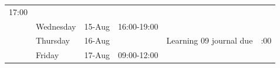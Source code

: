 \documentclass[]{book}
\theoremstyle{definition}
\theoremstyle{definition}
\theoremstyle{definition}
\theoremstyle{remark}
\begin{document}
\begin{longtable}[]{@{}rllllr@{}}
\begin{minipage}[t]{0.08\columnwidth}
17:00\strut
\end{minipage}\tabularnewline
\begin{minipage}[t]{0.08\columnwidth}\raggedleft
\strut
\end{minipage} & \begin{minipage}[t]{0.12\columnwidth}\raggedright
Wednesday\strut
\end{minipage} & \begin{minipage}[t]{0.09\columnwidth}\raggedright
15-Aug\strut
\end{minipage} & \begin{minipage}[t]{0.16\columnwidth}\raggedright
16:00-19:00\strut
\end{minipage} & \begin{minipage}[t]{0.29\columnwidth}\raggedright
\strut
\end{minipage} & \begin{minipage}[t]{0.08\columnwidth}\raggedleft
\strut
\end{minipage}\tabularnewline
\begin{minipage}[t]{0.08\columnwidth}\raggedleft
\strut
\end{minipage} & \begin{minipage}[t]{0.12\columnwidth}\raggedright
Thursday\strut
\end{minipage} & \begin{minipage}[t]{0.09\columnwidth}\raggedright
16-Aug\strut
\end{minipage} & \begin{minipage}[t]{0.16\columnwidth}\raggedright
\strut
\end{minipage} & \begin{minipage}[t]{0.29\columnwidth}\raggedright
Learning 09 journal due\strut
\end{minipage} & \begin{minipage}[t]{0.08\columnwidth}\raggedleft
17:00\strut
\end{minipage}\tabularnewline
\begin{minipage}[t]{0.08\columnwidth}\raggedleft
\strut
\end{minipage} & \begin{minipage}[t]{0.12\columnwidth}\raggedright
Friday\strut
\end{minipage} & \begin{minipage}[t]{0.09\columnwidth}\raggedright
17-Aug\strut
\end{minipage} & \begin{minipage}[t]{0.16\columnwidth}\raggedright
09:00-12:00\strut

\end{minipage}
\end{longtable}
\end{document}
